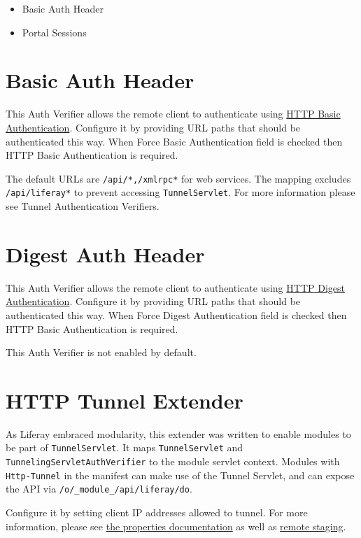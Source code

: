 \begin{itemize}
\tightlist
\item
  Basic Auth Header
\item
  Portal Sessions
\end{itemize}

\section{Basic Auth Header}\label{basic-auth-header}

This Auth Verifier allows the remote client to authenticate using
\href{https://en.wikipedia.org/wiki/Basic_access_authentication}{HTTP
Basic Authentication}. Configure it by providing URL paths that should
be authenticated this way. When Force Basic Authentication field is
checked then HTTP Basic Authentication is required.

The default URLs are \texttt{/api/*,/xmlrpc*} for web services. The
mapping excludes \texttt{/api/liferay*} to prevent accessing
\texttt{TunnelServlet}. For more information please see Tunnel
Authentication Verifiers.

\section{Digest Auth Header}\label{digest-auth-header}

This Auth Verifier allows the remote client to authenticate using
\href{https://en.wikipedia.org/wiki/Digest_access_authentication}{HTTP
Digest Authentication}. Configure it by providing URL paths that should
be authenticated this way. When Force Digest Authentication field is
checked then HTTP Basic Authentication is required.

This Auth Verifier is not enabled by default.

\section{HTTP Tunnel Extender}\label{http-tunnel-extender}

As Liferay embraced modularity, this extender was written to enable
modules to be part of \texttt{TunnelServlet}. It maps
\texttt{TunnelServlet} and \texttt{TunnelingServletAuthVerifier} to the
module servlet context. Modules with \texttt{Http-Tunnel} in the
manifest can make use of the Tunnel Servlet, and can expose the API via
\texttt{/o/\_module\_/api/liferay/do}.

Configure it by setting client IP addresses allowed to tunnel. For more
information, please see
\href{https://docs.liferay.com/portal/7.2-latest/propertiesdoc/portal.properties.html\#HTTP\%20Tunneling}{the
properties documentation} as well as
\href{/docs/7-2/user/-/knowledge_base/u/enabling-remote-live-staging}{remote
staging}.

